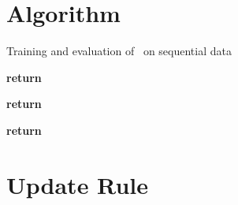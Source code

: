 \section{\sgem Algorithm}
\label{sec:agem:algorithm}
\begin{algorithm}[h!]
\caption{Training and evaluation of \sgem\ on sequential data } \label{alg:sgem}
\footnotesize
\begin{multicols}{2}
\begin{algorithmic}[1]
    \State 
    \State 
    \For{}
                \For{}
                        \State 
                        \State 
                        \State 
                                                      \If{}
                                                                               \State 
                                                                                                      \Else
                                                                                                      \State 
                        \EndIf
                        \State 
                \EndFor
                \State 
                \State 
        \EndFor
    \State \textbf{return} 
  \EndProcedure
\end{algorithmic}
\columnbreak
\begin{algorithmic}[1]
                \State 
       \For{}
                \State 
            \For{}
                          \State 
            \EndFor
            \State 
       \EndFor
       \State \textbf{return} 
   \EndProcedure
\end{algorithmic}
\vspace{2mm}
\begin{algorithmic}[1]
                \State 
        \For{}
                \State 
            \State 
        \EndFor
        \State \textbf{return} 
   \EndProcedure
\end{algorithmic}
\end{multicols}
\end{algorithm}

\section{\sgem Update Rule}
\label{sec:supp_sgem_update_rule}

